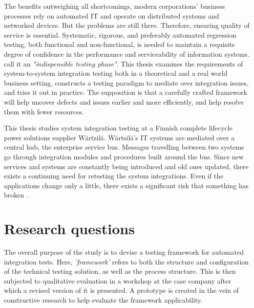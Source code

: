 \documentclass[12pt,a4paper,oneside,pdftex]{report}
\begin{document}
The benefits outweighing all shortcomings, modern corporations' business processes rely on automated IT and operate on distributed systems and networked devices. But the problems are still there. Therefore, ensuring quality of service is essential. Systematic, rigorous, and preferably automated regression testing, both functional and non-functional, is needed to maintain a requisite degree of confidence in the performance and serviceability of information systems. \citet{rehman2007testing} call it an \emph{"indispensible testing phase"}. This thesis examines the requirements of system-to-system integration testing both in a theoretical and a real world business setting, constructs a testing paradigm to mediate over integration issues, and tries it out in practice. The supposition is that a carefully crafted framework will help uncover defects and issues earlier and more efficiently, and help resolve them with fewer resources.


This thesis studies system integration testing at a Finnish complete lifecycle power solutions supplier Wärtsilä. Wärtsilä's IT systems are mediated over a central hub, the enterprise service bus. Messages travelling between two systems go through integration modules and procedures built around the bus. Since new services and systems are constantly being introduced and old ones updated, there exists a continuing need for retesting the system integrations. Even if the applications change only a little, there exists a significant risk that something has broken \citep{pezze2008software}. 


\section{Research questions}

The overall purpose of the study is to devise a testing framework for automated integration tests. Here, \emph{'framework'} refers to both the structure and configuration of the technical testing solution, as well as the process structure. This is then subjected to qualitative evaluation in a workshop at the case company after which a revised version of it is presented. A prototype is created in the vein of constructive research to help evaluate the framework applicability.
\end{document}
